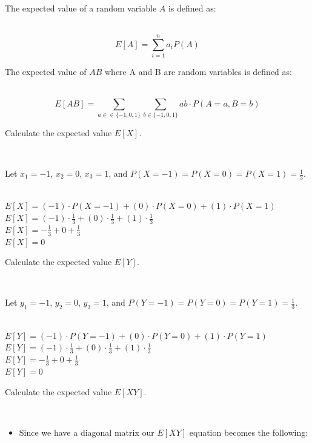 \documentclass{article}
\begin{document}
\parbox{\textwidth}{The expected value of a random variable $A$ is defined as:}\\

$$E[A] = \sum^{n}_{i=1} a_i P(A)$$

\parbox{\textwidth}{The expected value of $AB$  where A and B are random variables is defined as:}\\

$$E[AB] = \sum_{a \in \in \{-1,0,1\}} \sum_{b \in \{-1,0,1\}} ab \cdot P(A = a, B = b)$$

\parbox{\textwidth}{Calculate the expected value $E[X]$.}\\

\parbox{\textwidth}{Let $x_1 = -1$, $x_2 = 0$, $x_3 = 1$, and $P(X=-1) = P(X=0) = P(X=1) = \frac{1}{3}$.}\\

$E[X] = (-1) \cdot P(X = -1) + (0) \cdot P(X = 0) + (1) \cdot P(X = 1)$\\

$E[X] = (-1) \cdot \frac{1}{3} + (0) \cdot \frac{1}{3} + (1) \cdot \frac{1}{3}$\\

$E[X] = -\frac{1}{3} + 0 + \frac{1}{3}$\\

$E[X] = 0$\\

\parbox{\textwidth}{Calculate the expected value $E[Y]$.}\\

\parbox{\textwidth}{Let $y_1 = -1$, $y_2 = 0$, $y_3 = 1$, and $P(Y=-1) = P(Y=0) = P(Y=1) = \frac{1}{3}$.}\\

$E[Y] = (-1) \cdot P(Y = -1) + (0) \cdot P(Y = 0) + (1) \cdot P(Y = 1)$\\

$E[Y] = (-1) \cdot \frac{1}{3} + (0) \cdot \frac{1}{3} + (1) \cdot \frac{1}{3}$\\

$E[Y] = -\frac{1}{3} + 0 + \frac{1}{3}$\\

$E[Y] = 0$\\

\parbox{\textwidth}{Calculate the expected value $E[XY]$.}\\

\begin{itemize}
    \item \parbox{\textwidth}{Since we have a diagonal matrix our $E[XY]$ equation becomes the following:}
\end{itemize}
\end{document}
